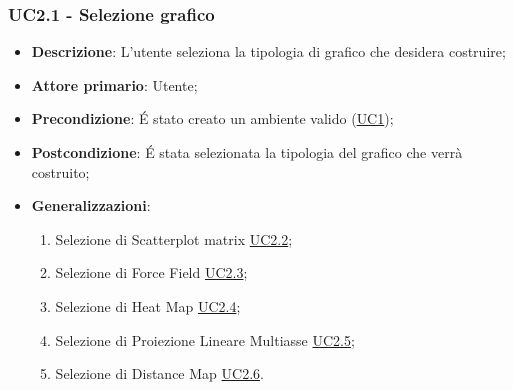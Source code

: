 \subsubsection{UC2.1 - Selezione grafico}
\label{ssub:uc2.1}
\begin{itemize}

	\item \textbf{Descrizione}: L’utente seleziona la tipologia di grafico che desidera costruire;

    \item \textbf{Attore primario}: Utente;

	\item \textbf{Precondizione}:   É stato creato un ambiente valido (\hyperref[sub:uc1]{UC1});
	
    \item \textbf{Postcondizione}:  É stata selezionata la tipologia del grafico che verrà costruito;

	\item \textbf{Generalizzazioni}:
		\begin{enumerate}
			
			\item Selezione di Scatterplot matrix \hyperref[ssub:uc2.2]{UC2.2};
			\item Selezione di Force Field \hyperref[ssub:uc2.3]{UC2.3};
			\item Selezione di Heat Map \hyperref[ssub:uc2.4]{UC2.4};
			\item Selezione di Proiezione Lineare Multiasse \hyperref[ssub:uc2.5]{UC2.5};
			\item Selezione di Distance Map \hyperref[ssub:uc2.6]{UC2.6}.
			
		\end{enumerate}

\end{itemize}



